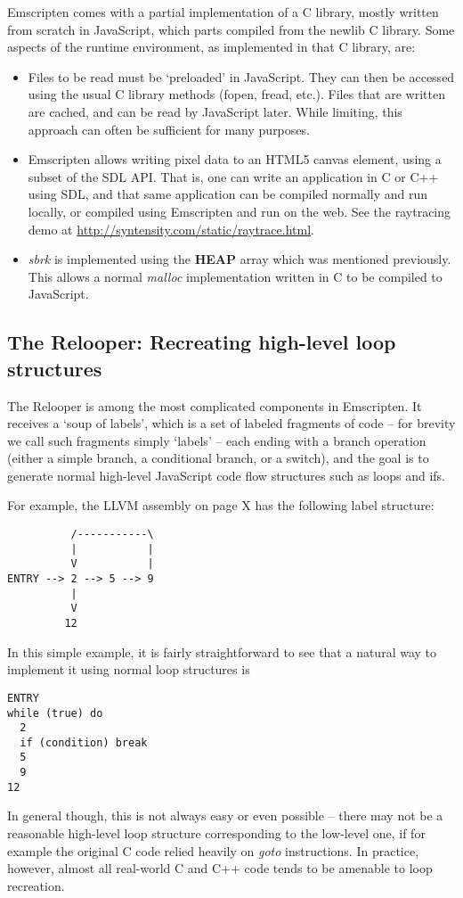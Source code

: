 \documentclass[11pt]{proc}
\begin{document}
Emscripten comes with a partial implementation of a C library,
mostly written from scratch in JavaScript, which parts compiled from the
newlib C library. Some aspects of the runtime environment, as
implemented in that C library, are:
\begin{itemize}
\item Files to be read must be `preloaded' in JavaScript. They can
      then be accessed using the usual C library methods (fopen, fread, etc.).
      Files that are written are cached, and can be read by JavaScript
      later. While limiting, this approach can often be sufficient for
      many purposes.
\item Emscripten allows writing pixel data to an HTML5 canvas element,
      using a subset of the SDL API. That is, one can write an application in C or C++ using
      SDL, and that same application can be compiled normally and run
      locally, or compiled using Emscripten and run on the web. See
      the raytracing demo at \url{http://syntensity.com/static/raytrace.html}.
\item \emph{sbrk} is implemented using the \textbf{HEAP} array which
      was mentioned previously. This allows a normal \emph{malloc}
      implementation written in C to be compiled to JavaScript.
\end{itemize}

\subsection{The Relooper: Recreating high-level loop structures}

The Relooper is among the most complicated components in Emscripten. It receives
a `soup of labels', which is a set of labeled fragments of code -- for brevity we call such fragments simply `labels' -- each
ending with a branch operation (either a simple branch, a conditional branch, or a switch), and the goal is to generate normal
high-level JavaScript code flow structures such as loops and ifs.

For example, the LLVM assembly on page X has the following label
structure:
\begin{verbatim}
          /-----------\
          |           |
          V           |
ENTRY --> 2 --> 5 --> 9
          |
          V
         12
\end{verbatim}
In this simple example, it is fairly straightforward to see that a natural way to implement it
using normal loop structures is
\begin{verbatim}
ENTRY
while (true) do
  2
  if (condition) break
  5
  9
12
\end{verbatim}
In general though, this is not always easy or even possible -- there may
not be a reasonable high-level loop structure corresponding to the low-level one, if
for example the original C code relied heavily on \emph{goto} instructions.
In practice, however, almost all real-world C and C++ code tends to
be amenable to loop recreation.
\end{document}
